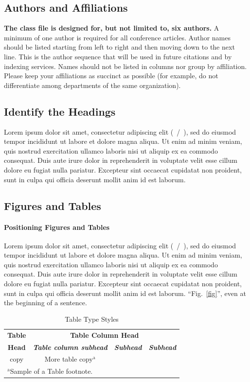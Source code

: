 \documentclass[conference]{IEEEtran}
\begin{document}
\subsection{Authors and Affiliations}
\textbf{The class file is designed for, but not limited to, six authors.} A 
minimum of one author is required for all conference articles. Author names 
should be listed starting from left to right and then moving down to the 
next line. This is the author sequence that will be used in future citations 
and by indexing services. Names should not be listed in columns nor group by 
affiliation. Please keep your affiliations as succinct as possible (for 
example, do not differentiate among departments of the same organization).

\subsection{Identify the Headings}
    Lorem ipsum dolor sit amet, consectetur adipiscing elit (~/~), sed do eiusmod 
    tempor incididunt ut labore et dolore magna aliqua. Ut enim ad minim 
    veniam, quis nostrud exercitation ullamco laboris nisi ut aliquip ex ea 
    commodo consequat. Duis aute irure dolor in reprehenderit in voluptate 
    velit esse cillum dolore eu fugiat nulla pariatur. Excepteur sint occaecat 
    cupidatat non proident, sunt in culpa qui officia deserunt mollit anim id 
    est laborum.

\subsection{Figures and Tables}
\paragraph{Positioning Figures and Tables}
    Lorem ipsum dolor sit amet, consectetur adipiscing elit (~/~), sed do eiusmod 
    tempor incididunt ut labore et dolore magna aliqua. Ut enim ad minim 
    veniam, quis nostrud exercitation ullamco laboris nisi ut aliquip ex ea 
    commodo consequat. Duis aute irure dolor in reprehenderit in voluptate 
    velit esse cillum dolore eu fugiat nulla pariatur. Excepteur sint occaecat 
    cupidatat non proident, sunt in culpa qui officia deserunt mollit anim id 
    est laborum. ``Fig.~\ref{fig}'', even at the beginning of a sentence.

\begin{table}[htbp]
\caption{Table Type Styles}
\begin{center}
\begin{tabular}{|c|c|c|c|}
\hline
\textbf{Table}&\multicolumn{3}{|c|}{\textbf{Table Column Head}} \\
\cline{2-4} 
\textbf{Head} & \textbf{\textit{Table column subhead}}& \textbf{\textit{Subhead}}& \textbf{\textit{Subhead}} \\
\hline
copy& More table copy$^{\mathrm{a}}$& &  \\
\hline
\multicolumn{4}{l}{$^{\mathrm{a}}$Sample of a Table footnote.}
\end{tabular}
\label{tab1}
\end{center}
\end{table}
\end{document}
